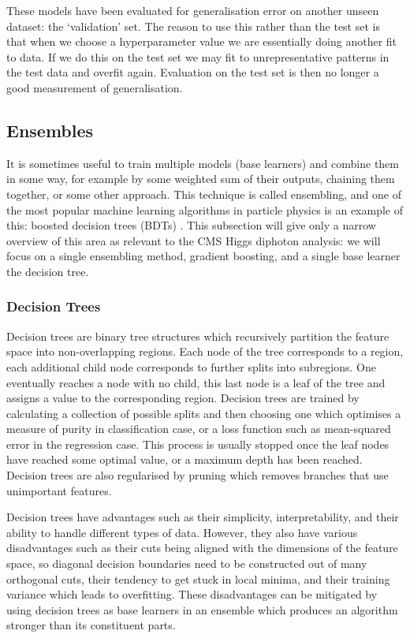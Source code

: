 These models have been evaluated for generalisation error on another unseen dataset: the `validation' set. The reason to use this rather than the test set is that when we choose a hyperparameter value we are essentially doing another fit to data. If we do this on the test set we may fit to unrepresentative patterns in the test data and overfit again. Evaluation on the test set is then no longer a good measurement of generalisation. 








\subsection{Ensembles}

It is sometimes useful to train multiple models (base learners) and combine them in some way, for example by some weighted sum of their outputs, chaining them together, or some other approach. This technique is called ensembling, and one of the most popular machine learning algorithms in particle physics is an example of this: boosted decision trees (BDTs) \cite{MiniBooneBDT}. This subsection will give only a narrow overview of this area as relevant to the CMS Higgs diphoton analysis: we will focus on a single ensembling method, gradient boosting, and a single base learner the decision tree.


\subsubsection{Decision Trees}
Decision trees \cite{DecisionTrees} are binary tree structures which recursively partition the feature space into non-overlapping regions. Each node of the tree corresponds to a region, each additional child node corresponds to further splits into subregions. One eventually reaches a node with no child, this last node is a leaf of the tree and assigns a value to the corresponding region.  
Decision trees are trained by calculating a collection of possible splits and then choosing one which optimises a measure of purity in classification case, or a loss function such as mean-squared error in the regression case. This process is usually stopped once the leaf nodes have reached some optimal value, or a maximum depth has been reached. 
Decision trees are also regularised by pruning which removes branches that use unimportant features. 

Decision trees have advantages such as their simplicity, interpretability, and their ability to handle different types of data. However, they also have various disadvantages such as their cuts being aligned with the dimensions of the feature space, so diagonal decision boundaries need to be constructed out of many orthogonal cuts, their tendency to get stuck in local minima, and their training variance which leads to overfitting. These disadvantages can be mitigated by using decision trees as base learners in an ensemble which produces an algorithm stronger than its constituent parts. 

